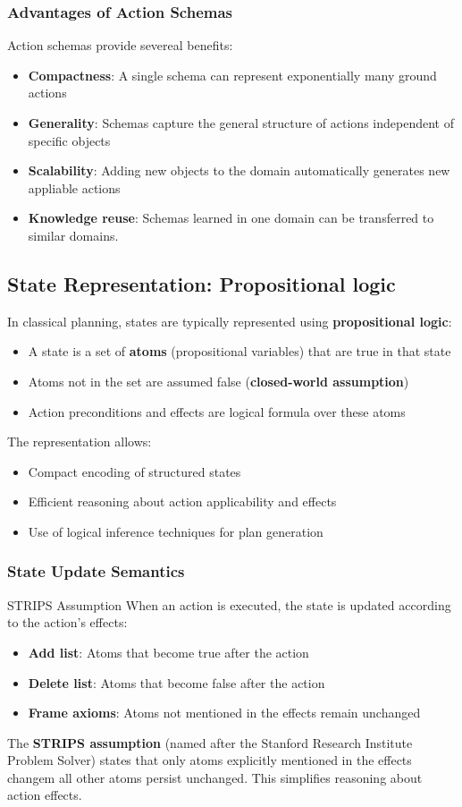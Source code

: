 \documentclass[a4paper]{article}
\theoremstyle{definition}
\begin{document}
\subsubsection{Advantages of Action Schemas}
Action schemas provide severeal benefits:
\begin{itemize}
    \item \textbf{Compactness}: A single schema can represent exponentially many ground actions 
    \item \textbf{Generality}: Schemas capture the general structure of actions independent of specific objects 
    \item \textbf{Scalability}: Adding new objects to the domain automatically generates new appliable actions 
    \item \textbf{Knowledge reuse}: Schemas learned in one domain can be transferred to similar domains.
\end{itemize}
\subsection{State Representation: Propositional logic}
In classical planning, states are typically represented using \textbf{propositional logic}:
\begin{itemize}
    \item A state is a set of \textbf{atoms} (propositional variables) that are true in that state
    \item Atoms not in the set are assumed false (\textbf{closed-world assumption})
    \item Action preconditions and effects are logical formula over these atoms 
\end{itemize}
The representation allows:
\begin{itemize}
    \item Compact encoding of structured states
    \item Efficient reasoning about action applicability and effects 
    \item Use of logical inference techniques for plan generation
\end{itemize}
\subsubsection{State Update Semantics}
\begin{example}{STRIPS Assumption}
When an action is executed, the state is updated according to the action's effects:
\begin{itemize}
    \item \textbf{Add list}: Atoms that become true after the action 
    \item \textbf{Delete list}: Atoms that become false after the action
    \item \textbf{Frame axioms}: Atoms not mentioned in the effects remain unchanged
\end{itemize}
The \textbf{STRIPS assumption} (named after the Stanford Research Institute Problem Solver) states
that only atoms explicitly mentioned in the effects changem all other atoms persist unchanged.
This simplifies reasoning about action effects.
\end{example}
\end{document}
